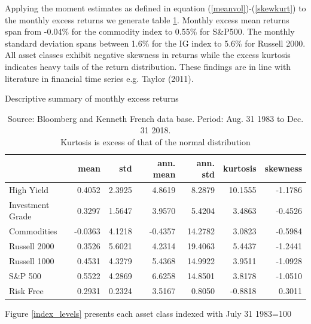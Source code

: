 \documentclass[11pt,a4paper,oneside]{article}
\begin{document}
\noindent Applying the moment estimates as defined in equation (\ref{meanvol})-(\ref{skewkurt}) to the monthly excess returns we generate table \ref{descriptive_statistics}. Monthly excess mean returns span from -0.04\% for the commodity index to 0.55\% for S\&P500. The monthly standard deviation spans between 1.6\% for the IG index to 5.6\% for Russell 2000. All asset classes exhibit negative skewness in returns while the excess kurtosis indicates heavy tails of the return distribution. These findings are in line with literature in financial time series e.g. Taylor (2011)\cite{Taylor}.           

\begin{table}[h!]
\centering
\captionsetup{justification=centering,margin=0.6cm}
\caption{Descriptive summary of monthly excess returns}
\label{descriptive_statistics}
\begin{tabular}{lrrrrrr}
\toprule
{} &    mean &     std &  ann. mean &  ann. std &  kurtosis &  skewness \\
\midrule
High Yield       &  0.4052 &  2.3925 &     4.8619 &    8.2879 &   10.1555 &   -1.1786 \\
Investment Grade &  0.3297 &  1.5647 &     3.9570 &    5.4204 &    3.4863 &   -0.4526 \\
Commodities      & -0.0363 &  4.1218 &    -0.4357 &   14.2782 &    3.0823 &   -0.5984 \\
Russell 2000     &  0.3526 &  5.6021 &     4.2314 &   19.4063 &    5.4437 &   -1.2441 \\
Russell 1000     &  0.4531 &  4.3279 &     5.4368 &   14.9922 &    3.9511 &   -1.0928 \\
S\&P 500          &  0.5522 &  4.2869 &     6.6258 &   14.8501 &    3.8178 &   -1.0510 \\
Risk Free        &  0.2931 &  0.2324 &     3.5167 &    0.8050 &   -0.8818 &    0.3011 \\
\bottomrule
\end{tabular}
\caption*{Source: Bloomberg and Kenneth French data base.
Period: Aug. 31 1983 to Dec. 31 2018. \\ Kurtosis is excess of that of the normal distribution}
\end{table}

\noindent Figure \ref{index_levels} presents each asset class indexed with July 31 1983=100



   
\end{document}
